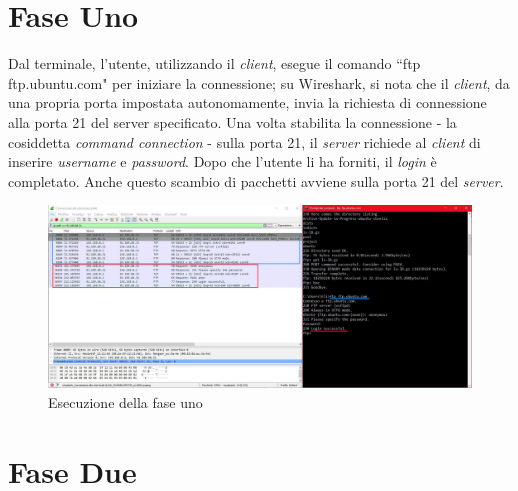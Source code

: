 \documentclass[a4paper, 12pt]{report}
\begin{document}
\section{Fase Uno}

Dal terminale, l'utente, utilizzando il \textit{client}, esegue il
comando ``ftp ftp.ubuntu.com" per iniziare la connessione; su Wireshark, si nota che il \textit{client}, da una propria porta impostata autonomamente, invia la richiesta di connessione alla porta
21 del server specificato. Una volta stabilita la connessione - la cosiddetta \textit{command connection} - sulla porta 21, il \textit{server} richiede al \textit{client} di inserire \textit{username}
e \textit{password}. Dopo che l'utente li ha forniti, il \textit{login} è completato. Anche questo scambio di pacchetti avviene sulla porta 21 del \textit{server}.

\begin{figure}[H]
	\centering
	\includegraphics[width=\linewidth]{images/image1_2.png}
	\caption{Esecuzione della fase uno}
\end{figure}

\section{Fase Due}
\end{document}
